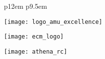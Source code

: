 \begin{center}
\begin{minipage}[t]{.52\linewidth}
{\begin{tabular}{p{12em} p{9.5em}}
        \end{tabular}
        }
	\end{minipage}\hfill
\end{center}       

\vspace{2em}

\begin{center} %
	\begin{minipage}[c]{.3\linewidth}
       \centering\texttt{[image: logo\_amu\_excellence]} 
	\end{minipage}\hfill
	\begin{minipage}[c]{.3\linewidth}
		\centering\texttt{[image: ecm\_logo]}
	\end{minipage}\hfill
	\begin{minipage}[c]{.3\linewidth}
		\centering\texttt{[image: athena\_rc]} 
	\end{minipage}\hfill
\end{center}


\restoregeometry
